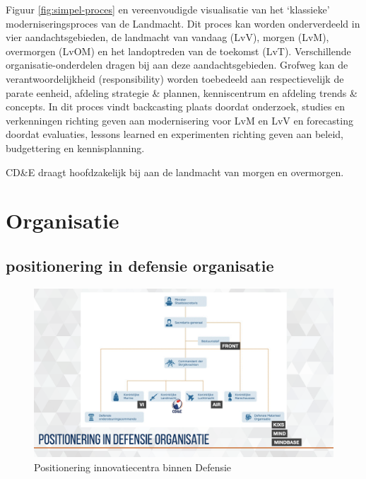 \documentclass[
]{book}
\begin{document}
Figuur \ref{fig:simpel-proces} en vereenvoudigde visualisatie van het `klassieke' moderniseringsproces van de Landmacht. Dit proces kan worden onderverdeeld in vier aandachtsgebieden, de landmacht van vandaag (LvV), morgen (LvM), overmorgen (LvOM) en het landoptreden van de toekomst (LvT). Verschillende organisatie-onderdelen dragen bij aan deze aandachtsgebieden. Grofweg kan de verantwoordelijkheid (responsibility) worden toebedeeld aan respectievelijk de parate eenheid, afdeling strategie \& plannen, kenniscentrum en afdeling trends \& concepts.
In dit proces vindt backcasting plaats doordat onderzoek, studies en verkenningen richting geven aan modernisering voor LvM en LvV en forecasting doordat evaluaties, lessons learned en experimenten richting geven aan beleid, budgettering en kennisplanning.

CD\&E draagt hoofdzakelijk bij aan de landmacht van morgen en overmorgen.

\hypertarget{cde-algemeen}{%
\chapter{Organisatie}\label{cde-algemeen}}

\hypertarget{positionering-in-defensie-organisatie}{%
\section{positionering in defensie organisatie}\label{positionering-in-defensie-organisatie}}

\begin{figure}
\includegraphics[width=26.67in]{data/keynote-slides/20200430-CDE-Designprocess/20200430-CDE-Designprocess.009-1} \caption{Positionering innovatiecentra binnen Defensie }\label{fig:unnamed-chunk-6}
\end{figure}
\end{document}
